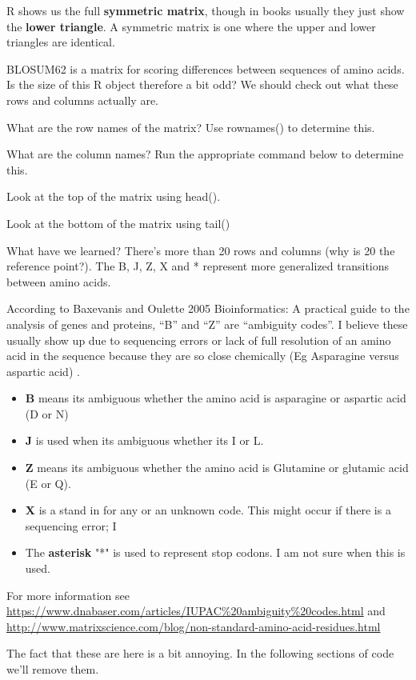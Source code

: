 \documentclass[
]{book}
\providecommand{\tightlist}{%
  \setlength{\itemsep}{0pt}\setlength{\parskip}{0pt}}
\begin{document}
R shows us the full \textbf{symmetric matrix}, though in books usually they just show the \textbf{lower triangle}. A symmetric matrix is one where the upper and lower triangles are identical.

BLOSUM62 is a matrix for scoring differences between sequences of amino acids. Is the size of this R object therefore a bit odd? We should check out what these rows and columns actually are.

What are the row names of the matrix? Use rownames() to determine this.

What are the column names? Run the appropriate command below to determine this.

Look at the top of the matrix using head().

Look at the bottom of the matrix using tail()

What have we learned? There's more than 20 rows and columns (why is 20 the reference point?). The B, J, Z, X and * represent more generalized transitions between amino acids.

According to Baxevanis and Oulette 2005 Bioinformatics: A practical guide to the analysis of genes and proteins, ``B'' and ``Z'' are ``ambiguity codes''. I believe these usually show up due to sequencing errors or lack of full resolution of an amino acid in the sequence because they are so close chemically (Eg Asparagine versus aspartic acid) .

\begin{itemize}
\tightlist
\item
  \textbf{B} means its ambiguous whether the amino acid is asparagine or aspartic acid (D or N)
\item
  \textbf{J} is used when its ambiguous whether its I or L.
\item
  \textbf{Z} means its ambiguous whether the amino acid is Glutamine or glutamic acid (E or Q).
\item
  \textbf{X} is a stand in for any or an unknown code. This might occur if there is a sequencing error; I
\item
  The \textbf{asterisk} "*" is used to represent stop codons. I am not sure when this is used.
\end{itemize}

For more information see \url{https://www.dnabaser.com/articles/IUPAC\%20ambiguity\%20codes.html} and \url{http://www.matrixscience.com/blog/non-standard-amino-acid-residues.html}

The fact that these are here is a bit annoying. In the following sections of code we'll remove them.
\end{document}
